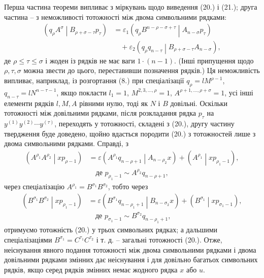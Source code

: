\documentclass[11pt]{article}
\newcommand{\pair}[2]{\left(#1\middle|#2\right)}
\newcommand{\eps}{\varepsilon}
\begin{document}
Перша частина теореми випливає з міркувань щодо виведення (20.) і (21.); друга частина -- з неможливості тотожності між двома символьними рядками:
\[
\begin{aligned}
\pair{q_\rho A^\sigma}{B_{\rho+\sigma-\tau}p_\tau}
&=\eps_1\pair{q_\rho B^{n-\rho-\sigma+\tau}}{A_{n-\sigma}p_\tau}\\
&\quad+\eps_2\pair{q_\rho q_{n-\tau}}{B_{\rho+\sigma-\tau}A_{n-\sigma}},
\end{aligned}
\]
де $\rho\le\tau\le\sigma$ і жоден із рядків не має ваги $1\cdot(n-1)$. (Інші припущення щодо $\rho,\tau,\sigma$ можна звести до цього, переставивши позначення рядків.) Ця неможливість випливає, наприклад, із розгортання (8.) при спеціалізації $q_\rho=lM^{\rho-1}$, $q_{n-\tau}=lN^{n-\tau-1}$, якщо покласти $l_1=1$, $M^{2,3,\ldots,\rho}=1$, $A^{\rho+1,\ldots,\rho+\sigma}=1$, усі інші елементи рядків $l,M,A$ рівними нулю, тоді як $N$ і $B$ довільні. Оскільки тотожності між довільними рядками, після розкладання рядка $p_\tau$ на $y^{(1)}y^{(2)}\cdots y^{(\tau)}$, переходять у тотожності, складені з (20.), другу частину твердження буде доведено, щойно вдасться породити (20.) з тотожностей лише з двома символьними рядками. Справді, з
\begin{equation}
\begin{aligned}
\pair{A^{\rho_1}A^{\rho_2}}{xp_{\rho-1}}
&=\eps\pair{A^{\rho_1}q_{n-\rho+1}}{A_{n-\rho_2}x}
+\pair{A^{\rho_1}}{xp_{\rho_1-1}},\\
&\quad \text{де }p_{\rho_1-1}\sim A^{\rho_2}q_{n-\rho+1},
\end{aligned}
\tag{20a}
\end{equation}
через спеціалізацію $A^{\rho_1}=B^{\sigma_1}B^{\sigma_2}$, тобто через
\[
\begin{aligned}
\pair{B^{\sigma_1}B^{\sigma_2}}{xp_{\rho_1-1}}
&=\eps\pair{B^{\sigma_1}q_{n-\rho_1+1}}{B_{n-\sigma_2}x}
+\pair{B^{\sigma_1}}{xp_{\sigma_1-1}},\\
&\quad \text{де } p_{\sigma_1-1}\sim B^{\sigma_2}q_{n-\rho_1+1},
\end{aligned}
\]
отримуємо тотожність (20.) у трьох символьних рядках; а дальшими спеціалізаціями $B^{\sigma_1}=C^{\tau_1}C^{\tau_2}$ і т. д. -- загальні тотожності (20.). Отже, неіснування явного подання тотожності між двома символьними рядками і двома довільними рядками змінних дає неіснування і для довільно багатьох символьних рядків, якщо серед рядків змінних немає жодного рядка $x$ або $u$.
\end{document}
